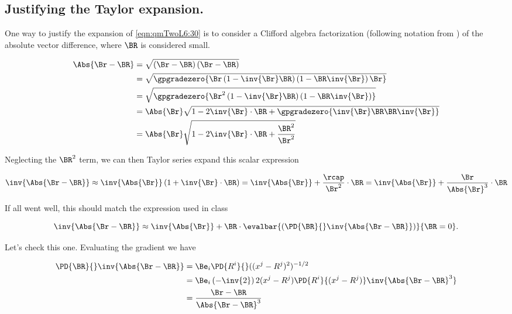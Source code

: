 \subsection{Justifying the Taylor expansion.}

One way to justify the expansion of \ref{eqn:qmTwoL6:30} is to consider a Clifford algebra factorization (following notation from \cite{doran2003gap}) of the absolute vector difference, where $\BR$ is considered small.

\begin{align*}
\Abs{\Br - \BR}
&= \sqrt{ \left(\Br - \BR\right) \left(\Br - \BR\right) } \\
&= \sqrt{ \gpgradezero{\Br \left(1 - \inv{\Br} \BR\right) \left(1 - \BR \inv{\Br}\right) \Br} } \\
&= \sqrt{ \gpgradezero{\Br^2 \left(1 - \inv{\Br} \BR\right) \left(1 - \BR \inv{\Br}\right) } } \\
&= \Abs{\Br} \sqrt{ 1 - 2 \inv{\Br} \cdot \BR + \gpgradezero{\inv{\Br} \BR \BR \inv{\Br}}} \\
&= \Abs{\Br} \sqrt{ 1 - 2 \inv{\Br} \cdot \BR + \frac{\BR^2}{\Br^2}}
\end{align*}

Neglecting the $\BR^2$ term, we can then Taylor series expand this scalar expression 

\begin{equation}\label{eqn:qmTwoL6:150}
\inv{\Abs{\Br - \BR}} 
\approx
\inv{\Abs{\Br}} \left( 
1 + \inv{\Br} \cdot \BR
\right) 
=
\inv{\Abs{\Br}} 
+ \frac{\rcap}{\Br^2} \cdot \BR
=
\inv{\Abs{\Br}} 
+ \frac{\Br}{\Abs{\Br}^3} \cdot \BR
\end{equation}

If all went well, this should match the expression used in class

\begin{equation}\label{eqn:qmTwoL6:170}
\inv{\Abs{\Br - \BR}} \approx \inv{\Abs{\Br}} 
+ 
\BR \cdot \evalbar{\left(
\PD{\BR}{} \inv{\Abs{ \Br - \BR}}
\right)}{\BR = 0}.
\end{equation}

Let's check this one.  Evaluating the gradient we have

\begin{align*}
\PD{\BR}{} \inv{\Abs{ \Br - \BR}}
&=
\Be_i \PD{R^i}{} ((x^j - R^j)^2)^{-1/2} \\
&=
\Be_i \left(-\inv{2}\right) 2 (x^j - R^j) \PD{R^i}{(x^j - R^j)} \inv{\Abs{\Br - \BR}^3} \\
&= \frac{\Br - \BR}{
\Abs{\Br - \BR}^3} 
\end{align*}

